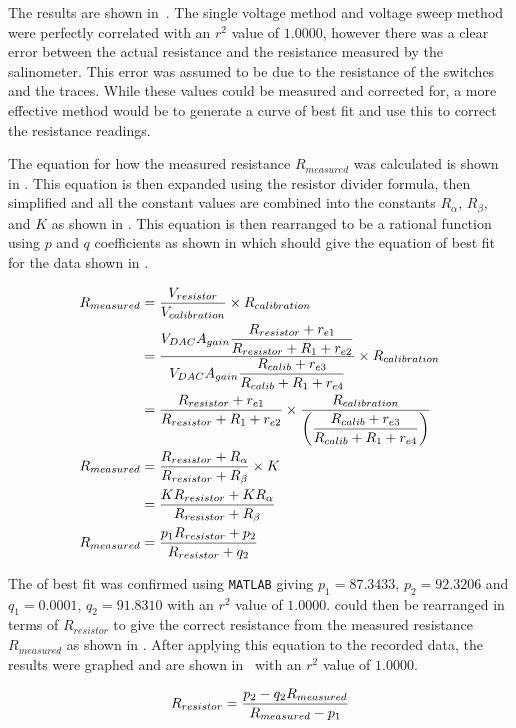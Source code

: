 The results are shown in~. 
The single voltage method and voltage sweep method were perfectly correlated with an $r^2$ value of $1.0000$, however there was a clear error between the actual resistance and the resistance measured by the salinometer.
This error was assumed to be due to the resistance of the switches and the traces.
While these values could be measured and corrected for, a more effective method would be to generate a curve of best fit and use this to correct the resistance readings.

The equation for how the measured resistance $R_{measured}$ was calculated is shown in .
This equation is then expanded using the resistor divider formula, then simplified and all the constant values are combined into the constants $R_{\alpha}$, $R_{\beta}$, and $K$ as shown in .
This equation is then rearranged to be a rational function using $p$ and $q$ coefficients as shown in  which should give the equation of best fit for the data shown in .

\begin{align}
    R_{measured} &= \frac{\displaystyle V_{resistor}}{\displaystyle V_{calibration}} \times R_{calibration} \label{eq:resistance-measuring} \\
    &= \frac{\displaystyle V_{DAC}{A_{gain}}\frac{\displaystyle R_{resistor} + r_{e1}}{\displaystyle R_{resistor} + R_1 + r_{e2}}}{\displaystyle V_{DAC}{A_{gain}}\frac{\displaystyle R_{calib} + r_{e3}}{\displaystyle R_{calib} + R_1 + r_{e4}}} \times R_{calibration} \nonumber \\
    &= \frac{\displaystyle R_{resistor} + r_{e1}}{\displaystyle R_{resistor} + R_1 + r_{e2}} \times \frac{\displaystyle R_{calibration}}{\displaystyle \left(\frac{\displaystyle R_{calib} + r_{e3}}{\displaystyle R_{calib} + R_1 + r_{e4}}\right)} \nonumber \\
    R_{measured} &= \frac{\displaystyle R_{resistor} + R_{\alpha}}{\displaystyle R_{resistor} + R_{\beta}} \times K \label{eq:resistance-measuring-simplified} \\
    &= \frac{\displaystyle KR_{resistor} + KR_{\alpha}}{\displaystyle R_{resistor} + R_{\beta}} \nonumber \\
    R_{measured} &= \frac{\displaystyle p_1 R_{resistor} + p_2}{\displaystyle R_{resistor} + q_2} \label{eq:resistance-measuring-rational}
\end{align}

The  of best fit was confirmed using \texttt{MATLAB} giving $p_1 = 87.3433$, $p_2 = 92.3206$ and $q_1 = 0.0001$, $q_2 = 91.8310$ with an $r^2$ value of $1.0000$. 
 could then be rearranged in terms of $R_{resistor}$ to give the correct resistance from the measured resistance $R_{measured}$ as shown in .  
After applying this equation to the recorded data, the results were graphed and are shown in~ with an $r^2$ value of $1.0000$.

\begin{equation}\label{eq:resistance-measuring-corrected}
    R_{resistor} = \frac{\displaystyle p_2 - q_2 R_{measured}}{\displaystyle R_{measured} - p_1}
\end{equation}